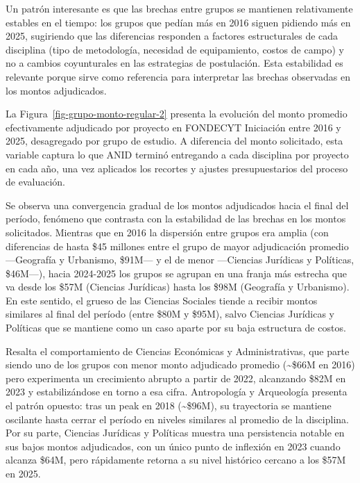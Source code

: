 \documentclass[
  spanish,
  a4paper,
  oneside]{scrbook}
\begin{document}
Un patrón interesante es que las brechas entre grupos se mantienen
relativamente estables en el tiempo: los grupos que pedían más en 2016
siguen pidiendo más en 2025, sugiriendo que las diferencias responden a
factores estructurales de cada disciplina (tipo de metodología,
necesidad de equipamiento, costos de campo) y no a cambios coyunturales
en las estrategias de postulación. Esta estabilidad es relevante porque
sirve como referencia para interpretar las brechas observadas en los
montos adjudicados.

La Figura~\ref{fig-grupo-monto-regular-2} presenta la evolución del
monto promedio efectivamente adjudicado por proyecto en FONDECYT
Iniciación entre 2016 y 2025, desagregado por grupo de estudio. A
diferencia del monto solicitado, esta variable captura lo que ANID
terminó entregando a cada disciplina por proyecto en cada año, una vez
aplicados los recortes y ajustes presupuestarios del proceso de
evaluación.

Se observa una convergencia gradual de los montos adjudicados hacia el
final del período, fenómeno que contrasta con la estabilidad de las
brechas en los montos solicitados. Mientras que en 2016 la dispersión
entre grupos era amplia (con diferencias de hasta \$45 millones entre el
grupo de mayor adjudicación promedio ---Geografía y Urbanismo, \$91M---
y el de menor ---Ciencias Jurídicas y Políticas, \$46M---), hacia
2024-2025 los grupos se agrupan en una franja más estrecha que va desde
los \$57M (Ciencias Jurídicas) hasta los \$98M (Geografía y Urbanismo).
En este sentido, el grueso de las Ciencias Sociales tiende a recibir
montos similares al final del período (entre \$80M y \$95M), salvo
Ciencias Jurídicas y Políticas que se mantiene como un caso aparte por
su baja estructura de costos.

Resalta el comportamiento de Ciencias Económicas y Administrativas, que
parte siendo uno de los grupos con menor monto adjudicado promedio
(\textasciitilde\$66M en 2016) pero experimenta un crecimiento abrupto a
partir de 2022, alcanzando \$82M en 2023 y estabilizándose en torno a
esa cifra. Antropología y Arqueología presenta el patrón opuesto: tras
un peak en 2018 (\textasciitilde\$96M), su trayectoria se mantiene
oscilante hasta cerrar el período en niveles similares al promedio de la
disciplina. Por su parte, Ciencias Jurídicas y Políticas muestra una
persistencia notable en sus bajos montos adjudicados, con un único punto
de inflexión en 2023 cuando alcanza \$64M, pero rápidamente retorna a su
nivel histórico cercano a los \$57M en 2025.
\end{document}
